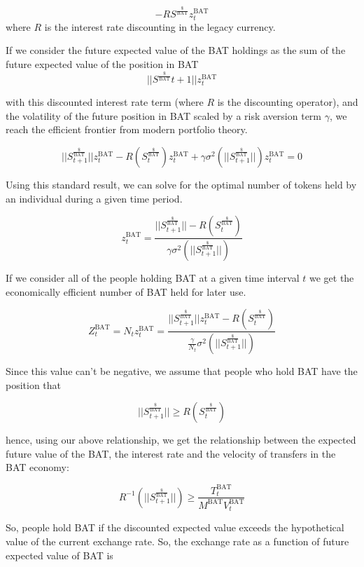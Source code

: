 \documentclass[11pt]{article}
\begin{document}
\[ -R S^{\frac{\$}{\textrm{BAT}}} z^{\textrm{BAT}}_{t} \] 
where $R$ is the interest rate discounting in the legacy currency.

If we consider the future expected value of the \textrm{BAT} holdings as the
sum of the future expected value of the position in  \textrm{BAT}
\[ ||S^{\frac{\$}{\textrm{BAT}}}{t+1}|| z^{\textrm{BAT}}_{t}\]

with this discounted interest rate term (where $R$ is the discounting operator),
and the volatility of the future position in \textrm{BAT} scaled by a risk
aversion term $\gamma$, we reach the efficient frontier from modern portfolio
theory.

\[ ||S^{\frac{\$}{\textrm{BAT}}}_{t+1}|| z^{\textrm{BAT}}_{t} -R (S^{\frac{\$}{\textrm{BAT}}}_{t}) z^{\textrm{BAT}}_{t} + \gamma \sigma^{2}(||S^{\frac{\$}{\textrm{BAT}}}_{t+1}||) z^{\textrm{BAT}}_{t} =0\]

Using this standard result, we can solve for the optimal number of
tokens held by an individual during a given time period.

\[ z^{\textrm{BAT}}_{t} =\frac{||S^{\frac{\$}{\textrm{BAT}}}_{t+1}|| -R( S^{\frac{\$}{\textrm{BAT}}}_{t})}{ \gamma \sigma^{2}(||S^{\frac{\$}{\textrm{BAT}}}_{t+1}||) } \]

If we consider all of the people holding \textrm{BAT} at a given time interval $t$
we get the economically efficient number of \textrm{BAT} held for later use.

\[ Z^{\textrm{BAT}}_{t} = N_{t} z^{\textrm{BAT}}_{t} =\frac{||S^{\frac{\$}{\textrm{BAT}}}_{t+1}|| z^{\textrm{BAT}}_{t} -R(S^{\frac{\$}{\textrm{BAT}}}_{t})}{ \frac{\gamma}{N_{t}} \sigma^{2}(||S^{\frac{\$}{\textrm{BAT}}}_{t+1}||) } \]

Since this value can't be negative, we assume that people who hold \textrm{BAT}
have the position that

\[ ||S^{\frac{\$}{\textrm{BAT}}}_{t+1}|| \geq R( S^{\frac{\$}{\textrm{BAT}}}_{t})\]

hence, using our above relationship, we get the relationship between the expected future value of the \textrm{BAT}, the interest rate and the velocity of transfers in the \textrm{BAT} economy:

\[R^{-1} (||S^{\frac{\$}{\textrm{BAT}}}_{t+1}||) \geq \frac{T^{\textrm{BAT}}_{t}}{M^{\textrm{BAT}} V^{\textrm{BAT}}_{t}} \]

So, people hold \textrm{BAT} if the discounted expected value exceeds the
hypothetical value of the current exchange rate. So, the exchange rate
as a function of future expected value of \textrm{BAT} is
\end{document}

